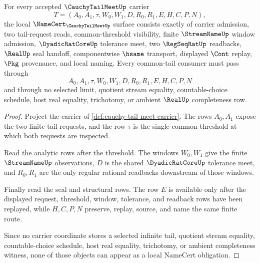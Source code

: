 \begin{theorem}
\label{thm:cauchy-tail-meet-namecert-obligations}
For every accepted $\CauchyTailMeetUp$ carrier
$$
T=(A_0,A_1,\tau,W_0,W_1,D,R_0,R_1,E,H,C,P,N),
$$
the local $\NameCert_{\CauchyTailMeetUp}$ surface consists exactly of carrier admission, two tail-request reads, common-threshold visibility, finite $\StreamNameUp$ window admission, $\DyadicRatCoreUp$ tolerance meet, two $\RegSeqRatUp$ readbacks, $\RealUp$ seal handoff, componentwise $\hsame$ transport, displayed $\Cont$ replay, $\Pkg$ provenance, and local naming. Every common-tail consumer must pass through
$$
A_0,A_1,\tau,W_0,W_1,D,R_0,R_1,E,H,C,P,N
$$
and through no selected limit, quotient stream equality, countable-choice schedule, host real equality, trichotomy, or ambient $\RealUp$ completeness row.
\end{theorem}
\begin{proof}
Project the carrier of \autoref{def:cauchy-tail-meet-carrier}. The rows $A_0,A_1$ expose the two finite tail requests, and the row $\tau$ is the single common threshold at which both requests are inspected.

Read the analytic rows after the threshold. The windows $W_0,W_1$ give the finite $\StreamNameUp$ observations, $D$ is the shared $\DyadicRatCoreUp$ tolerance meet, and $R_0,R_1$ are the only regular rational readbacks downstream of those windows.

Finally read the seal and structural rows. The row $E$ is available only after the displayed request, threshold, window, tolerance, and readback rows have been replayed, while $H,C,P,N$ preserve, replay, source, and name the same finite route.

Since no carrier coordinate stores a selected infinite tail, quotient stream equality, countable-choice schedule, host real equality, trichotomy, or ambient completeness witness, none of those objects can appear as a local NameCert obligation.
\end{proof}

